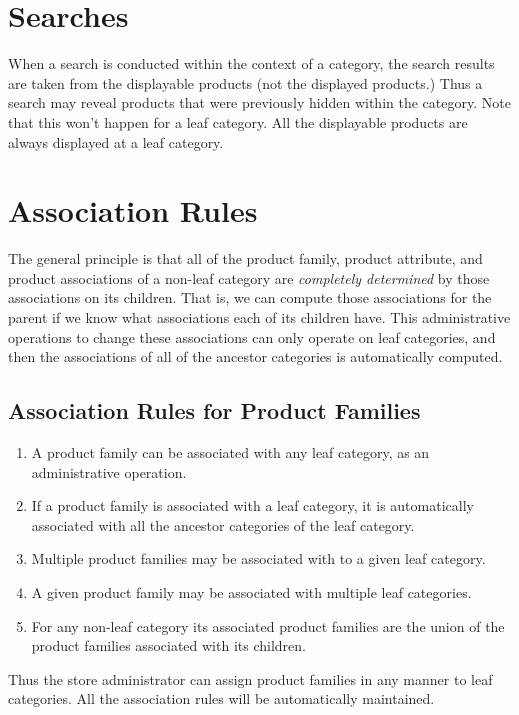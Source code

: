 \documentclass[letterpaper, 12pt]{article}
\begin{document}
\section{Searches}
When a search is conducted within the context of a category, the search results are taken from the displayable products (not the displayed products.)  Thus a search may reveal products that were previously hidden within the category.  Note that this won't happen for a leaf category.  All the displayable products are always displayed at a leaf category.

\section{Association Rules}\label{association-rules}
The general principle is that all of the product family, product attribute, and product associations of a non-leaf category are {\em completely determined} by those associations on its children.  That is, we can compute those associations for the parent if we know what associations each of its children have.  This administrative operations to change these associations can only operate on leaf categories, and then the associations of all of the ancestor categories is automatically computed.
\subsection{Association Rules for Product Families}
\begin{enumerate}
\item A product family can be associated with any leaf category, as an administrative operation.
\item If a product family is associated with a leaf category, it is automatically associated with all the ancestor categories of the leaf category.
\item Multiple product families may be associated with to a given leaf category.
\item A given product family may be associated with multiple leaf categories.
\item For any non-leaf category its associated product families are the union of the product families associated with its children.
\end{enumerate}
Thus the store administrator can assign product families in any manner to leaf categories.  All the association rules will be automatically maintained.
\end{document}
